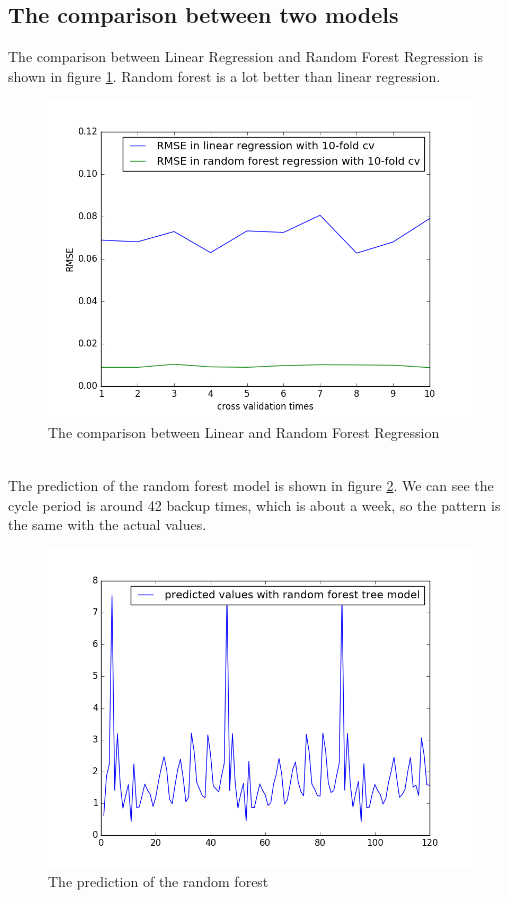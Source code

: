 \documentclass{article}
\begin{document}
\subsection{The comparison between two models}
The comparison between Linear Regression and Random Forest Regression is shown in figure \ref{fig:comp}. Random forest is a lot better than linear regression.\\
\begin{figure}[htbp]
\centering
\includegraphics[width=.6\textwidth]{compare.png}
\caption{The comparison between Linear and Random Forest Regression}
\label{fig:comp}
\end{figure}
\\
The prediction of the random forest model is shown in figure \ref{fig:r_pred}. We can see the cycle period is around 42 backup times, which is about a week, so the pattern is the same with the actual values.
\begin{figure}[htbp]
\centering
\includegraphics[width=.6\textwidth]{random_pred.png}
\caption{The prediction of the random forest}
\label{fig:r_pred}
\end{figure}
\end{document}
